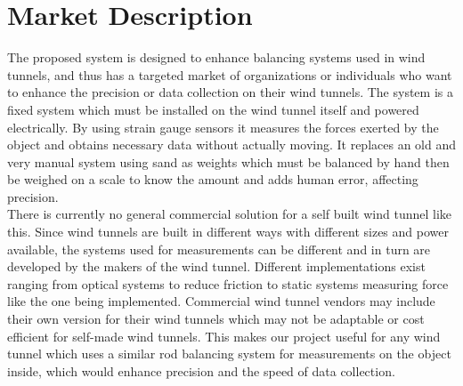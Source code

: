 \section{Market Description}
	The proposed system is designed to enhance balancing systems used in wind tunnels, and thus has a targeted market of organizations or individuals who want to enhance the precision or data collection on their wind tunnels. The system is a fixed system which must be installed on the wind tunnel itself and powered electrically. By using strain gauge sensors it measures the forces exerted by the object and obtains necessary data without actually moving. It replaces an old and very manual system using sand as weights which must be balanced by hand then be weighed on a scale to know the amount and adds human error, affecting precision.\\

	There is currently no general commercial solution for a self built wind tunnel like this. Since wind tunnels are built in different ways with different sizes and power available, the systems used for measurements can be different and in turn are developed by the makers of the wind tunnel. Different implementations exist ranging from optical systems  to reduce friction \cite{ref:market1} to static systems measuring force \cite{ref:market2} like the one being implemented. Commercial wind tunnel vendors may include their own version for their wind tunnels which may not be adaptable or cost efficient for self-made wind tunnels. This makes our project useful for any wind tunnel which uses a similar rod balancing system for measurements on the object inside, which would enhance precision and the speed of data collection.